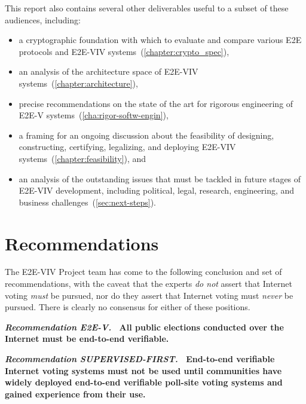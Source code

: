 This report also contains several other deliverables useful to a
subset of these audiences, including:
\begin{itemize}
\item a cryptographic foundation with which to evaluate and compare
  various E2E protocols and E2E-VIV
  systems~(\autoref{chapter:crypto_spec}),
\item an analysis of the architecture space of E2E-VIV
  systems~(\autoref{chapter:architecture}),
\item precise recommendations on the state of the art for rigorous
  engineering of E2E-V systems~(\autoref{cha:rigor-softw-engin}),
\item a framing for an ongoing discussion about the feasibility of
  designing, constructing, certifying, legalizing, and deploying
  E2E-VIV systems~(\autoref{chapter:feasibility}), and
\item an analysis of the outstanding issues that must be tackled in
  future stages of E2E-VIV development, including political, legal,
  research, engineering, and business
  challenges~(\autoref{sec:next-steps}).
\end{itemize}

\section{Recommendations}

The E2E-VIV Project team has come to the following conclusion and set
of recommendations, with the caveat that the experts \emph{do not}
assert that Internet voting \emph{must} be pursued, nor do they assert
that Internet voting must \emph{never} be pursued. There is clearly no
consensus for either of these positions.

\vspace{12pt} 
\textbf{\emph{Recommendation E2E-V.} \ All public elections conducted
  over the Internet must be end-to-end verifiable.} 

\textbf{\emph{Recommendation SUPERVISED-FIRST.} \ End-to-end
  verifiable Internet voting systems must not be used until
  communities have widely deployed end-to-end verifiable poll-site
  voting systems and gained experience from their use.}

